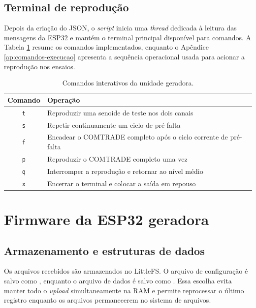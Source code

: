 \subsection{Terminal de reprodução}

Depois da criação do JSON, o \textit{script} inicia uma \textit{thread} dedicada à leitura das mensagens da ESP32 e mantém o terminal principal disponível para comandos. A Tabela \ref{tab:comandos-gerador} resume os comandos implementados, enquanto o Apêndice \ref{ap:comandos-execucao} apresenta a sequência operacional usada para acionar a reprodução nos ensaios.

\begin{table}[H]
  \centering
  \small
  \caption{Comandos interativos da unidade geradora.}
  \label{tab:comandos-gerador}
  \begin{tabular}{cl}
    \toprule
    Comando & Operação \\
    \midrule
    \texttt{t} & Reproduzir uma senoide de teste nos dois canais \\
    \texttt{s} & Repetir continuamente um ciclo de pré-falta \\
    \texttt{f} & Encadear o COMTRADE completo após o ciclo corrente de pré-falta \\
    \texttt{p} & Reproduzir o COMTRADE completo uma vez \\
    \texttt{q} & Interromper a reprodução e retornar ao nível médio \\
    \texttt{x} & Encerrar o terminal e colocar a saída em repouso \\
    \bottomrule
  \end{tabular}
\end{table}

\section{Firmware da ESP32 geradora}

\subsection{Armazenamento e estruturas de dados}

Os arquivos recebidos são armazenados no LittleFS. O arquivo de configuração é salvo como , enquanto o arquivo de dados é salvo como . Essa escolha evita manter todo o \textit{upload} simultaneamente na RAM e permite reprocessar o último registro enquanto os arquivos permanecerem no sistema de arquivos.

